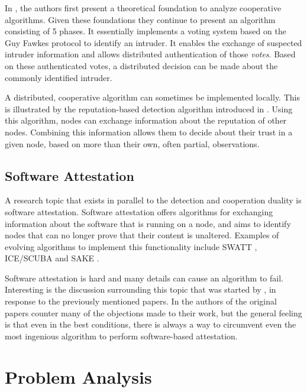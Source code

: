 \documentclass[conference]{IEEEtran}
\begin{document}
In \cite{krontiris2009cooperative}, the authors first present a theoretical
foundation to analyze cooperative algorithms. Given these foundations they
continue to present an algorithm consisting of 5 phases. It essentially
implements a voting system based on the Guy Fawkes protocol
\cite{anderson1998new} to identify an intruder. It enables the exchange of
suspected intruder information and allows distributed authentication of those
\emph{votes}. Based on these authenticated votes, a distributed decision can be
made about the commonly identified intruder.

A distributed, cooperative algorithm can sometimes be implemented locally. This
is illustrated by the reputation-based detection algorithm introduced in
\cite{ganeriwal2008reputation}. Using this algorithm, nodes can exchange
information about the reputation of other nodes. Combining this information
allows them to decide about their trust in a given node, based on more than
their own, often partial, observations.

\subsection{Software Attestation}
\label{subsection:attestation}

A research topic that exists in parallel to the detection and cooperation
duality is software attestation. Software attestation offers algorithms for
exchanging information about the software that is running on a node, and aims
to identify nodes that can no longer prove that their content is unaltered.
Examples of evolving algorithms to implement this functionality include SWATT
\cite{seshadri2004swatt}, ICE/SCUBA \cite{seshadri2006scuba} and SAKE
\cite{seshadri2008sake}.

Software attestation is hard and many details can cause an algorithm to fail.
Interesting is the discussion surrounding this topic that was started by
\cite{castelluccia2009difficulty}, in response to the previously mentioned
papers. In \cite{perrig2010refutation} the authors of the original papers
counter many of the objections made to their work, but the general feeling is
that even in the best conditions, there is always a way to circumvent even the
most ingenious algorithm to perform software-based attestation.

\section{Problem Analysis}
\label{section:problem}
\end{document}
